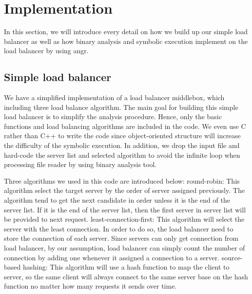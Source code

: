 \section{Implementation}

In this section, we will introduce every detail on how we build up our simple
load balancer as well as how binary analysis and symbolic execution implement on
the load balancer by using angr.


\subsection{Simple load balancer}

We have a simplified implementation of a load balancer
middlebox, which including three load balance algorithm.  The main goal for
building this simple load balancer is to simplify the analysis procedure.  Hence,
only the basic functions and load balancing algorithms are included in the code.
We even use C rather than C++ to write the code since object-oriented structure
will increase the difficulty of the symbolic execution.  In addition, we drop
the input file and hard-code the server list and selected algorithm to avoid the
infinite loop when processing file reader by using binary analysis tool.

Three algorithms we used in this code are introduced below:
\ci round-robin: This algorithm select the target server by the order of server
assigned previously.  The algorithm tend to get the next candidate in order
unless it is the end of the server list.  If it is the end of the server list,
then the first server in server list will be provided to next request.
\cii least-connection-first: This algorithm will select the server with the
least connection.  In order to do so, the load balancer need to store the
connection of each server.  Since servers can only get connection from load
balancer, by our assumption, load balancer can simply count the number of
connection by adding one whenever it assigned a connection to a server.
\ciii source-based hashing: This algorithm will use a hash function to map the
client to server, so the same client will always connect to the same server base
on the hash function no matter how many requests it sends over time.


